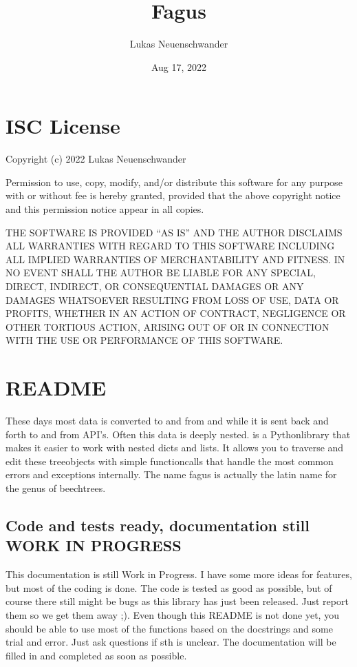 \documentclass[a4paper,10pt,english]{sphinxmanual}
\title{Fagus}
\date{Aug 17, 2022}
\author{Lukas Neuenschwander}
\begin{document}
\pagestyle{empty}
\sphinxmaketitle
\pagestyle{plain}
\sphinxtableofcontents
\pagestyle{normal}
\label{\detokenize{index::doc}}


\sphinxstepscope


\chapter{ISC License}
\label{\detokenize{LICENSE:isc-license}}\label{\detokenize{LICENSE::doc}}
\sphinxAtStartPar
Copyright (c) 2022 Lukas Neuenschwander

\sphinxAtStartPar
Permission to use, copy, modify, and/or distribute this software for any purpose with or without fee is hereby granted, provided that the above copyright notice and this permission notice appear in all copies.

\sphinxAtStartPar
THE SOFTWARE IS PROVIDED “AS IS” AND THE AUTHOR DISCLAIMS ALL WARRANTIES WITH REGARD TO THIS SOFTWARE INCLUDING ALL IMPLIED WARRANTIES OF MERCHANTABILITY AND FITNESS. IN NO EVENT SHALL THE AUTHOR BE LIABLE FOR ANY SPECIAL, DIRECT, INDIRECT, OR CONSEQUENTIAL DAMAGES OR ANY DAMAGES WHATSOEVER RESULTING FROM LOSS OF USE, DATA OR PROFITS, WHETHER IN AN ACTION OF CONTRACT, NEGLIGENCE OR OTHER TORTIOUS ACTION, ARISING OUT OF OR IN CONNECTION WITH THE USE OR PERFORMANCE OF THIS SOFTWARE.

\sphinxstepscope


\chapter{README}
\label{\detokenize{README:readme}}\label{\detokenize{README::doc}}
\sphinxAtStartPar
These days most data is converted to and from  and  while it is sent back and forth to and from API’s. Often this data is deeply nested.  is a Python\sphinxhyphen{}library that makes it easier to work with nested dicts and lists. It allows you to traverse and edit these tree\sphinxhyphen{}objects with simple function\sphinxhyphen{}calls that handle the most common errors and exceptions internally. The name fagus is actually the latin name for the genus of beech\sphinxhyphen{}trees.


\section{Code and tests ready, documentation still WORK IN PROGRESS}
\label{\detokenize{README:code-and-tests-ready-documentation-still-work-in-progress}}
\sphinxAtStartPar
This documentation is still Work in Progress. I have some more ideas for features, but most of the coding is done. The code is tested as good as possible, but of course there still might be bugs as this library has just been released. Just report them so we get them away ;). Even though this README is not done yet, you should be able to use most of the functions based on the docstrings and some trial and error. Just ask questions  if sth is unclear. The documentation will be filled in and completed as soon as possible.
\end{document}
